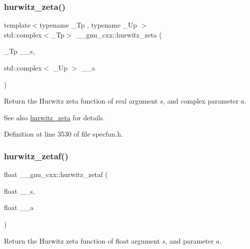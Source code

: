 \subsubsection{\texorpdfstring{hurwitz\+\_\+zeta()}{hurwitz\_zeta()}\hspace{0.1cm}{\footnotesize\ttfamily [2/2]}}
{\footnotesize\ttfamily template$<$typename \+\_\+\+Tp , typename \+\_\+\+Up $>$ \\
std\+::complex$<$\+\_\+\+Tp$>$ \+\_\+\+\_\+gnu\+\_\+cxx\+::hurwitz\+\_\+zeta (\begin{DoxyParamCaption}\item[{\+\_\+\+Tp}]{\+\_\+\+\_\+s,  }\item[{std\+::complex$<$ \+\_\+\+Up $>$}]{\+\_\+\+\_\+a }\end{DoxyParamCaption})}

Return the Hurwitz zeta function of real argument $ s $, and complex parameter $ a $.

\begin{DoxySeeAlso}{See also}
\hyperlink{group__gnu__math__spec__func_ga7b167ce1c8d9aa6aad40fc83a95733bd}{hurwitz\+\_\+zeta} for details. 
\end{DoxySeeAlso}


Definition at line 3530 of file specfun.\+h.

\mbox{\label{group__gnu__math__spec__func_gaa745d7f2edde060ed2f22817ad89df1f}} 
\subsubsection{\texorpdfstring{hurwitz\+\_\+zetaf()}{hurwitz\_zetaf()}}
{\footnotesize\ttfamily float \+\_\+\+\_\+gnu\+\_\+cxx\+::hurwitz\+\_\+zetaf (\begin{DoxyParamCaption}\item[{float}]{\+\_\+\+\_\+s,  }\item[{float}]{\+\_\+\+\_\+a }\end{DoxyParamCaption})\hspace{0.3cm}{\ttfamily [inline]}}

Return the Hurwitz zeta function of {\ttfamily float} argument $ s $, and parameter $ a $.

